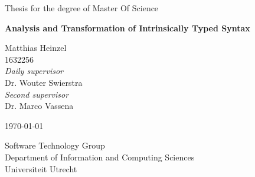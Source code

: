 \begin{titlepage}
  \begin{center}
    \vspace*{1cm}

    \large
    Thesis for the degree of Master Of Science

    \vspace{0.4cm}

    \Huge \textbf{Analysis and Transformation of Intrinsically Typed Syntax}
    \date{\today}

    \vspace{1.6cm}

    \large
    Matthias Heinzel\\
    1632256\\
    \vspace{0.8cm}
    \textit{Daily supervisor}\\
    Dr. Wouter Swierstra\\
    \vspace{0.4cm}
    \textit{Second supervisor}\\
    Dr. Marco Vassena\\

    \vfill

    \today

    \vspace{0.8cm}

    Software Technology Group\\
    Department of Information and Computing Sciences\\
    Universiteit Utrecht

  \end{center}
\end{titlepage}
